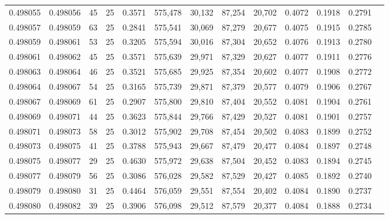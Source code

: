 \begin{tabular}{rrrrrrrrrrrrr}
0.498055 & 0.498056 &    45 &  25 &                                     0.3571 & 575,478 &  30,132 &  87,254 &  20,702 & 0.4072 & 0.1918 & 0.2791 \\
0.498057 & 0.498059 &    63 &  25 &                                     0.2841 & 575,541 &  30,069 &  87,279 &  20,677 & 0.4075 & 0.1915 & 0.2785 \\
0.498059 & 0.498061 &    53 &  25 &                                     0.3205 & 575,594 &  30,016 &  87,304 &  20,652 & 0.4076 & 0.1913 & 0.2780 \\
0.498061 & 0.498062 &    45 &  25 &                                     0.3571 & 575,639 &  29,971 &  87,329 &  20,627 & 0.4077 & 0.1911 & 0.2776 \\
0.498063 & 0.498064 &    46 &  25 &                                     0.3521 & 575,685 &  29,925 &  87,354 &  20,602 & 0.4077 & 0.1908 & 0.2772 \\
0.498064 & 0.498067 &    54 &  25 &                                     0.3165 & 575,739 &  29,871 &  87,379 &  20,577 & 0.4079 & 0.1906 & 0.2767 \\
0.498067 & 0.498069 &    61 &  25 &                                     0.2907 & 575,800 &  29,810 &  87,404 &  20,552 & 0.4081 & 0.1904 & 0.2761 \\
0.498069 & 0.498071 &    44 &  25 &                                     0.3623 & 575,844 &  29,766 &  87,429 &  20,527 & 0.4081 & 0.1901 & 0.2757 \\
0.498071 & 0.498073 &    58 &  25 &                                     0.3012 & 575,902 &  29,708 &  87,454 &  20,502 & 0.4083 & 0.1899 & 0.2752 \\
0.498073 & 0.498075 &    41 &  25 &                                     0.3788 & 575,943 &  29,667 &  87,479 &  20,477 & 0.4084 & 0.1897 & 0.2748 \\
0.498075 & 0.498077 &    29 &  25 &                                     0.4630 & 575,972 &  29,638 &  87,504 &  20,452 & 0.4083 & 0.1894 & 0.2745 \\
0.498077 & 0.498079 &    56 &  25 &                                     0.3086 & 576,028 &  29,582 &  87,529 &  20,427 & 0.4085 & 0.1892 & 0.2740 \\
0.498079 & 0.498080 &    31 &  25 &                                     0.4464 & 576,059 &  29,551 &  87,554 &  20,402 & 0.4084 & 0.1890 & 0.2737 \\
0.498080 & 0.498082 &    39 &  25 &                                     0.3906 & 576,098 &  29,512 &  87,579 &  20,377 & 0.4084 & 0.1888 & 0.2734 \\

\end{tabular}
